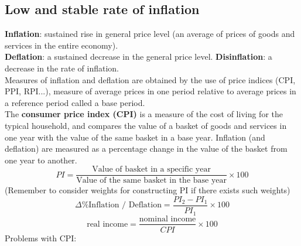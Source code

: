 \documentclass[a4paper,12pt]{article}
\newcommand{\needbold}[1]{\textcolor{red!70!black}{\textbf{#1}}}
\begin{document}
\subsection{Low and stable rate of inflation}
\needbold{Inflation}: sustained rise in general price level (an average of prices of goods and services in the entire economy).\\
\needbold{Deflation}: a sustained decrease in the general price level.
\needbold{Disinflation}: a decrease in the rate of inflation.\\
Measures of inflation and deflation are obtained by the use of price indices (CPI, PPI, RPI...), measure of average prices in one period relative to average prices in a reference period called a base period.\\
The \needbold{consumer price index (CPI)} is a measure of the cost of living for the typical household, and compares the value of a basket of goods and services in one year with the value of the same basket in a base year. Inflation (and deflation) are measured as a percentage change in the value of the basket from one year to another.
\[PI=\dfrac{\text{Value of basket in a specific year}}{\text{Value of the same basket in the base year}}\times 100\]
(Remember to consider weights for constructing PI if there exists such weights)
\[\Delta \% \text{Inflation / Deflation}=\dfrac{PI_2-PI_1}{PI_1}\times 100\]
\[\text{real income}=\dfrac{\text{nominal income}}{CPI}\times 100\]
Problems with CPI:
\end{document}

